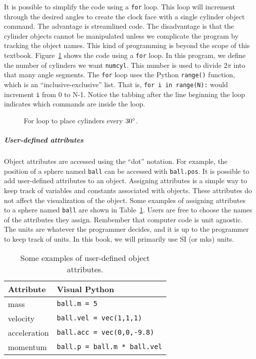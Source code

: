 It is possible to simplify the code using a \texttt{for} loop. This loop will increment through the desired angles to create the clock face with a single cylinder object command. The advantage is streamlined code. The disadvantage is that the cylinder objects cannot be manipulated unless we complicate the program by tracking the object names. This kind of programming is beyond the scope of this textbook. Figure~\ref{fig:visualpython:forloopcylinder} shows the code using a \texttt{for} loop. In this program, we define the number of cylinders we want \texttt{numcyl}. This number is used to divide $2\pi$ into that many angle segments. The \texttt{for} loop uses the Python \texttt{range()} function, which is an ``inclusive-exclusive'' list. That is, \texttt{for i in range(N):} would increment \texttt{i} from 0 to N-1. Notice the tabbing after the line beginning the loop indicates which commands are inside the loop.

\begin{figure}[!htbp]
\centering
\caption[]{For loop to place cylinders every $30\degree$.}
\label{fig:visualpython:forloopcylinder}
\end{figure}

\subparagraph{User-defined attributes}

Object attributes are accessed using the ``dot'' notation. For example, the position of a sphere named \texttt{ball} can be accessed with \texttt{ball.pos}. It is possible to add user-defined attributes to an object. Assigning attributes is a simple way to keep track of variables and constants associated with objects. These attributes do not affect the visualization of the object. Some examples of assigning attributes to a sphere named \texttt{ball} are shown in Table~\ref{tab:visualpython:userattributes}. Users are free to choose the names of the attributes they assign. Rembember that computer code is unit agnostic. The units are whatever the programmer decides, and it is up to the programmer to keep track of units. In this book, we will primarily use SI (or mks) units.

\begin{table}
\centering
\caption[]{Some examples of user-defined object attributes.}
\label{tab:visualpython:userattributes}
\begin{tabular}{p{}p{}}
\toprule
\textbf{Attribute} & \textbf{Visual Python} \\
\hline
mass & \texttt{ball.m = 5} \\
velocity & \texttt{ball.vel = vec(1,1,1)} \\
acceleration & \texttt{ball.acc = vec(0,0,-9.8)} \\
momentum & \texttt{ball.p = ball.m * ball.vel} \\
\bottomrule
\end{tabular}
\end{table}

